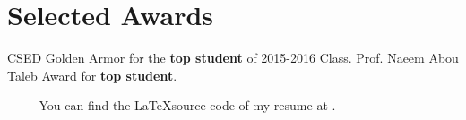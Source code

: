 \documentclass[letterpaper]{twentysecondcv} %
\begin{document}

\section{Selected Awards}

\begin{twentyshort}
	       {CSED Golden Armor for the \textbf{top student} of 2015-2016 Class.}
	       {Prof. Naeem Abou Taleb Award for \textbf{top student}.}
\end{twentyshort}

\vfill
\footnotesize{
\begin{itemize}[leftmargin=10px]
    \item[--] You can find the \LaTeX source code of my resume at .
\end{itemize}
}
\end{document}
